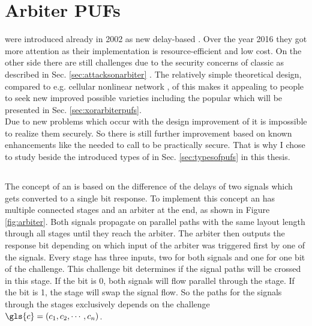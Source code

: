 \chapter{Arbiter \acsp{PUF}}
\label{cap:arbiter}

\apufs were introduced already in 2002 as new delay-based \puf \cite{Gassend2002SiliconFunctions}.
Over the year 2016 they got more attention as their implementation is resource-efficient and low cost. \cite{Becker2014ActiveDesigns,Suh2007PhysicalGeneration}
On the other side there are still challenges due to the security concerns of classic \apufs as described in Sec. \ref{sec:attacksonarbiter} \cite{Ganji2016PACPUFs, Ruhrmair2014PUFOverview}.
The relatively simple theoretical design, compared to e.g. cellular nonlinear network \pufs, of this \apuf makes it appealing to people to seek new improved possible varieties including the popular \xpuf which will be presented in Sec. \ref{sec:xorarbiterpufs}.\\
Due to new problems which occur with the design improvement of \xpufs it is impossible to realize them securely.
So there is still further improvement based on known enhancements like the \xpuf needed to call \apufs to be practically secure.
That is why I chose to study \apufs beside the introduced types of \pufs in Sec. \ref{sec:typesofpufs} in this thesis.

\section{\apufs}
\label{sec:arbiter}

The concept of an \apufs is based on the difference of the delays of two signals which gets converted to a single bit response. 
To implement this concept an \apuf has multiple connected stages and an arbiter at the end, as shown in Figure \ref{fig:arbiter}.
Both signals propagate on parallel paths with the same layout length through all stages until they reach the arbiter.
The arbiter then outputs the response bit depending on which input of the arbiter was triggered first by one of the signals.
Every stage has three inputs, two for both signals and one for one bit of the challenge.
This challenge bit determines if the signal paths will be crossed in this stage. 
If the bit is 0, both signals will flow parallel through the stage.
If the bit is 1, the stage will swap the signal flow.
So the paths for the signals through the stages exclusively depends on the challenge $\gls{c} = (c_1, c_2, \cdots, c_n)$.

